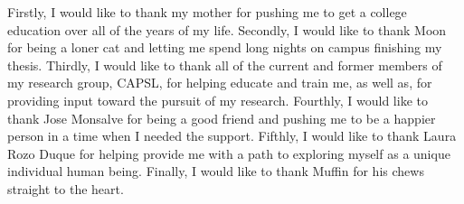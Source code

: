 Firstly, I would like to thank my mother for pushing me to get a college education over all of the years of my life. Secondly, I would like to thank Moon for being a loner cat and letting me spend long nights on campus finishing my thesis. Thirdly, I would like to thank all of the current and former members of my research group, CAPSL, for helping educate and train me, as well as, for providing input toward the pursuit of my research. Fourthly, I would like to thank Jose Monsalve for being a good friend and pushing me to be a happier person in a time when I needed the support. Fifthly, I would like to thank Laura Rozo Duque for helping provide me with a path to exploring myself as a unique individual human being. Finally, I would like to thank Muffin for his chews straight to the heart. 